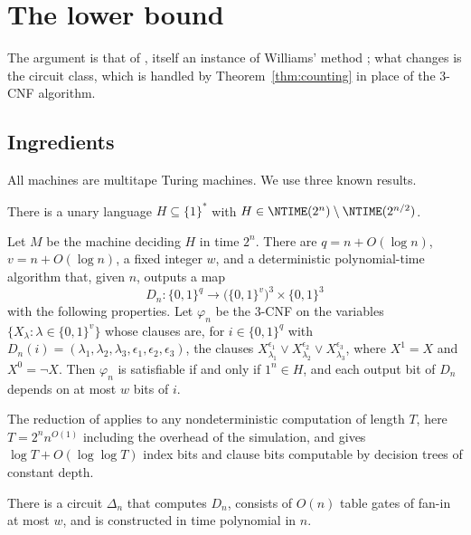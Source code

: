 
\section{The lower bound}\label{sec:lower}

The argument is that of \cite[Appendix C.1]{OAI26}, itself an instance of
Williams' method \cite{Wil13}; what changes is the circuit class, which is
handled by Theorem~\ref{thm:counting} in place of the $3$-CNF algorithm.

\subsection{Ingredients}
All machines are multitape Turing machines. We use three known results.

\begin{lemma}\label{lem:zak}
There is a unary language $H\subseteq\{1\}^*$ with
$H\in\NTIME(2^n)\setminus\NTIME(2^{n/2})$.
\end{lemma}

\begin{lemma}\label{lem:jmv}
Let $M$ be the machine deciding $H$ in time $2^n$. There are $q=n+O(\log n)$,
$v=n+O(\log n)$, a fixed integer $w$, and a deterministic polynomial-time
algorithm that, given $n$, outputs a map
\[
D_n:\{0,1\}^q\to\bigl(\{0,1\}^v\bigr)^3\times\{0,1\}^3
\]
with the following properties. Let $\varphi_n$ be the $3$-CNF on the variables
$\{X_\lambda:\lambda\in\{0,1\}^v\}$ whose clauses are, for $i\in\{0,1\}^q$ with
$D_n(i)=(\lambda_1,\lambda_2,\lambda_3,\epsilon_1,\epsilon_2,\epsilon_3)$, the
clauses $X_{\lambda_1}^{\epsilon_1}\vee X_{\lambda_2}^{\epsilon_2}\vee
X_{\lambda_3}^{\epsilon_3}$, where $X^1=X$ and $X^0=\neg X$. Then $\varphi_n$ is
satisfiable if and only if $1^n\in H$, and each output bit of $D_n$ depends on at
most $w$ bits of $i$.
\end{lemma}

The reduction of \cite{JMV15} applies to any nondeterministic computation of
length $T$, here $T=2^nn^{O(1)}$ including the overhead of the simulation, and
gives $\log T+O(\log\log T)$ index bits and clause bits computable by decision
trees of constant depth.

\begin{lemma}\label{lem:decoder}
There is a circuit $\Delta_n$ that computes $D_n$, consists of $O(n)$ table
gates of fan-in at most $w$, and is constructed in time polynomial in $n$.
\end{lemma}

